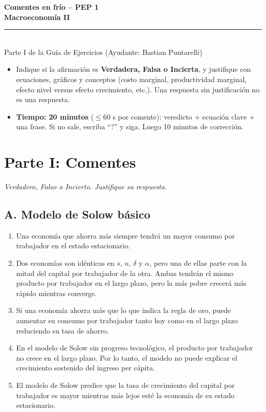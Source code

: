 \documentclass[11pt,letterpaper]{article}
\begin{document}
\begin{center}
  {\Large\bfseries Comentes en frío -- PEP 1}\\[2pt]
  {\large\bfseries Macroeconomía II}\\[6pt]
  \rule{\textwidth}{0.4pt}\\[2pt]
  Parte I de la Guía de Ejercicios (Ayudante: Bastian Puntarelli)
\end{center}

\begin{itemize}
  \item Indique si la afirmación es \textbf{Verdadera, Falsa o Incierta}, y justifique con ecuaciones,
  gráficos y conceptos (costo marginal, productividad marginal, efecto nivel versus efecto crecimiento,
  etc.). Una respuesta sin justificación no es una respuesta.
  \item \textbf{Tiempo: 20 minutos} ($\le 60$ s por comente): veredicto + ecuación clave + una frase.
  Si no sale, escriba ``?'' y siga. Luego 10 minutos de corrección.
\end{itemize}

\section*{Parte I: Comentes}
\textit{Verdadero, Falso o Incierto. Justifique su respuesta.}

\subsection*{A. Modelo de Solow básico}
\begin{enumerate}[series=comentes]
  \item Una economía que ahorra más siempre tendrá un mayor consumo por trabajador en el estado estacionario.
  \item Dos economías son idénticas en $s$, $n$, $\delta$ y $\alpha$, pero una de ellas parte con la mitad del capital por
  trabajador de la otra. Ambas tendrán el mismo producto por trabajador en el largo plazo, pero la
  más pobre crecerá más rápido mientras converge.
  \item Si una economía ahorra más que lo que indica la regla de oro, puede aumentar su consumo por
  trabajador tanto hoy como en el largo plazo reduciendo su tasa de ahorro.
  \item En el modelo de Solow sin progreso tecnológico, el producto por trabajador no crece en el largo
  plazo. Por lo tanto, el modelo no puede explicar el crecimiento sostenido del ingreso per cápita.
  \item El modelo de Solow predice que la tasa de crecimiento del capital por trabajador es mayor mientras
  más lejos esté la economía de su estado estacionario.
\end{enumerate}
\end{document}
